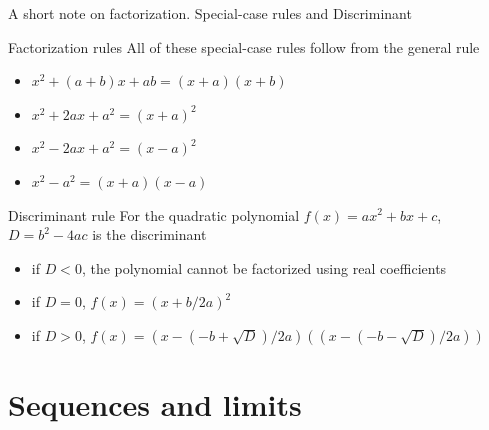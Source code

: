\documentclass[9pt]{beamer}
\begin{document}

\begin{frame}{A short note on factorization. Special-case rules and Discriminant}

    \begin{block}{Factorization rules}
        All of these special-case rules follow from the general rule
        \begin{itemize}[leftmargin = 0.5cm, label = $\bullet$ , rightmargin = 0.2cm]
            \item $x^2 + (a + b)x + ab = (x + a)(x + b)$
            \item $x^2 + 2ax + a^2 = (x + a)^2 $
            \item $x^2 - 2ax + a^2 = (x - a)^2$
            \item $x^2 - a^2 = (x + a)(x - a)$
        \end{itemize}

    \end{block}
    \vspace{0.5cm}
    
    \begin{block}{Discriminant rule}
        For the quadratic polynomial $f(x) = ax^2 + bx + c$, $D = b^2 - 4ac$ is the discriminant

        \begin{itemize}[leftmargin = 0.5cm, label = $\bullet$, rightmargin = 0.2cm]
            \item if $D < 0$, the polynomial cannot be factorized using real coefficients
            \item if $D = 0$, $f(x) = (x + b/2a)^2$
            \item if $D > 0$, $f(x) = (x - (-b + \sqrt{D})/2a)((x - (-b - \sqrt{D})/2a))$
        \end{itemize}
        
    \end{block}
    
\end{frame}

\section{Sequences and limits}
\end{document}
